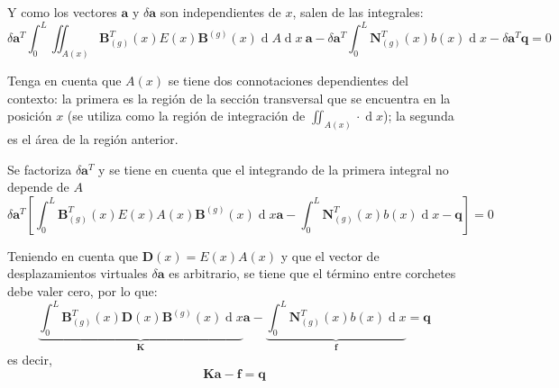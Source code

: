 \documentclass[12pt,letterpaper,landscape]{article}
\newcommand{\ve}[1]{{\boldsymbol{#1}}}
\newcommand{\ma}[1]{{\boldsymbol{#1}}}
\newcommand{\dd}{\operatorname{d} \!}
\begin{document}
Y como los vectores $\ve{a}$ y $\delta \ve{a}$  son independientes de $x$, salen de las integrales:
\begin{equation}
\delta \ve{a}^T \int_{0}^{L} \iint_{A(x)}  \ma{B}_{(g)}^T(x) E(x) \ma{B}^{(g)}(x) \dd A \dd x\ \ve{a} - \delta \ve{a}^T \int_{0}^{L}  \ma{N}_{(g)}^T(x) b(x) \dd x 
- \delta \ma{a}^T \ma{q} = 0
\end{equation}

Tenga en cuenta que $A(x)$ se tiene dos connotaciones dependientes del contexto: la primera es la región de la sección transversal que se encuentra en la posición $x$ (se utiliza como la región de integración de $\iint_{A(x)} \cdot \dd x$); la segunda es el área de la región anterior. 

Se factoriza $\delta \ma{a}^T$ y se tiene en cuenta que el integrando de la primera integral no depende de $A$
\begin{equation}
\delta \ve{a}^T 
\left[ \int_{0}^{L} \ma{B}_{(g)}^T(x) E(x) A(x) \ma{B}^{(g)}(x) \dd x \ve{a}
%
- \int_{0}^{L}  \ma{N}_{(g)}^T(x) b(x) \dd x 
- \ma{q}\right] = 0
\end{equation}

Teniendo en cuenta que $\ma{D}(x) = E(x) A(x)$ y que el vector de desplazamientos virtuales $\delta \ma{a}$ es arbitrario, se tiene que el término entre corchetes debe valer cero, por lo que:
\begin{equation}
\underbrace{\int_{0}^{L} \ma{B}_{(g)}^T(x) \ma{D}(x) \ma{B}^{(g)}(x) \dd x}_{\ma{K}} \ve{a} 
- \underbrace{\int_{0}^{L}  \ma{N}_{(g)}^T(x) b(x) \dd x}_{\ma{f}} 
= \ma{q}
\end{equation}
es decir,
\begin{equation}
\ma{K}\ve{a} - \ma{f} = \ma{q}
\end{equation}
\end{document}
